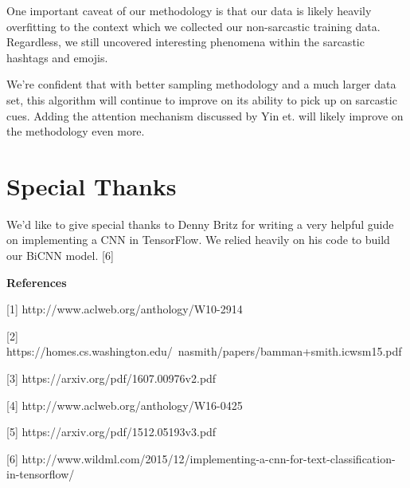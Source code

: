 \documentclass[11pt,a4paper]{article}
\begin{document}
One important caveat of our methodology is that our data is likely heavily overfitting to the context which we collected our non-sarcastic training data. Regardless, we still uncovered interesting phenomena within the sarcastic hashtags and emojis.

We're confident that with better sampling methodology and a much larger data set, this algorithm will continue to improve on its ability to pick up on sarcastic cues.  Adding the attention mechanism discussed by Yin et. will likely improve on the methodology even more.

\section{Special Thanks}

We'd like to give special thanks to Denny Britz for writing a very helpful guide on implementing a CNN in TensorFlow. We relied heavily on his code to build our BiCNN model. [6]

\textbf{References}

[1] http://www.aclweb.org/anthology/W10-2914

[2] https://homes.cs.washington.edu/~nasmith/papers/bamman+smith.icwsm15.pdf

[3] https://arxiv.org/pdf/1607.00976v2.pdf

[4] http://www.aclweb.org/anthology/W16-0425

[5] https://arxiv.org/pdf/1512.05193v3.pdf

[6] http://www.wildml.com/2015/12/implementing-a-cnn-for-text-classification-in-tensorflow/
\end{document}
